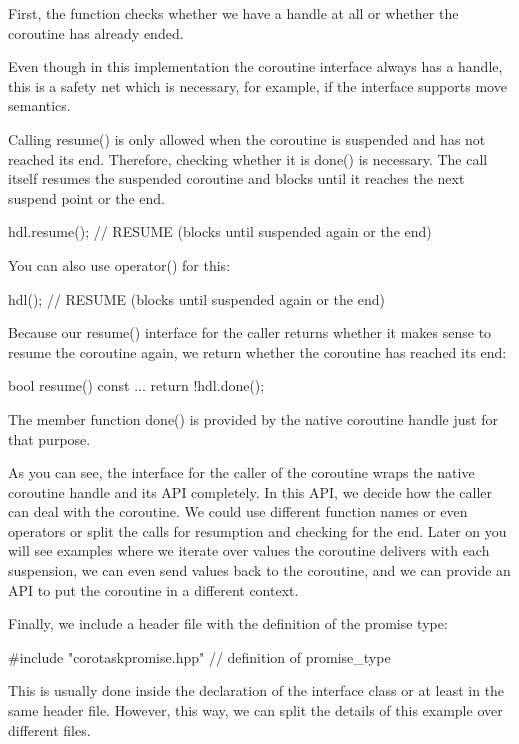 First, the function checks whether we have a handle at all or whether the coroutine has already ended.

Even though in this implementation the coroutine interface always has a handle, this is a safety net which is necessary, for example, if the interface supports move semantics.

Calling resume() is only allowed when the coroutine is suspended and has not reached its end. Therefore, checking whether it is done() is necessary. The call itself resumes the suspended coroutine and blocks until it reaches the next suspend point or the end.

\begin{cpp}
hdl.resume(); // RESUME (blocks until suspended again or the end)
\end{cpp}

You can also use operator() for this:

\begin{cpp}
hdl(); // RESUME (blocks until suspended again or the end)
\end{cpp}

Because our resume() interface for the caller returns whether it makes sense to resume the coroutine again, we return whether the coroutine has reached its end:

\begin{cpp}
bool resume() const {
	...
	return !hdl.done();
}
\end{cpp}

The member function done() is provided by the native coroutine handle just for that purpose.

As you can see, the interface for the caller of the coroutine wraps the native coroutine handle and its API completely. In this API, we decide how the caller can deal with the coroutine. We could use different function names or even operators or split the calls for resumption and checking for the end. Later on you will see examples where we iterate over values the coroutine delivers with each suspension, we can even send values back to the coroutine, and we can provide an API to put the coroutine in a different context.

Finally, we include a header file with the definition of the promise type:

\begin{cpp}
#include "corotaskpromise.hpp" // definition of promise_type
\end{cpp}

This is usually done inside the declaration of the interface class or at least in the same header file. However, this way, we can split the details of this example over different files.

